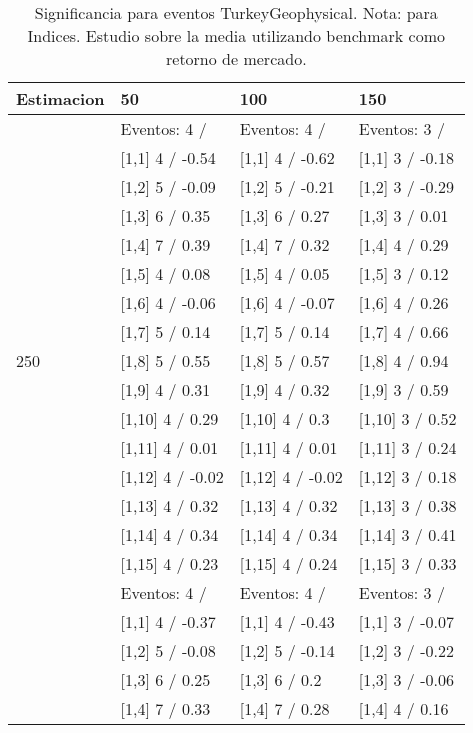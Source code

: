 \begin{table}

\caption{Significancia para eventos TurkeyGeophysical. Nota: para Indices. Estudio sobre la media utilizando benchmark como retorno de mercado.}
\centering
\begin{tabular}[t]{llll}
\toprule
Estimacion & 50 & 100 & 150\\
\midrule
 & Eventos:  4 / & Eventos:  4 / & Eventos:  3 /\\
 & {}[1,1] 4  / -0.54 & {}[1,1] 4  / -0.62 & {}[1,1] 3  / -0.18\\
 & {}[1,2] 5  / -0.09 & {}[1,2] 5  / -0.21 & {}[1,2] 3  / -0.29\\
 & {}[1,3] 6  / 0.35 & {}[1,3] 6  / 0.27 & {}[1,3] 3  / 0.01\\
 & {}[1,4] 7  / 0.39 & {}[1,4] 7  / 0.32 & {}[1,4] 4  / 0.29\\
\addlinespace
 & {}[1,5] 4  / 0.08 & {}[1,5] 4  / 0.05 & {}[1,5] 3  / 0.12\\
 & {}[1,6] 4  / -0.06 & {}[1,6] 4  / -0.07 & {}[1,6] 4  / 0.26\\
 & {}[1,7] 5  / 0.14 & {}[1,7] 5  / 0.14 & {}[1,7] 4  / 0.66\\
250 & {}[1,8] 5  / 0.55 & {}[1,8] 5  / 0.57 & {}[1,8] 4  / 0.94\\
 & {}[1,9] 4  / 0.31 & {}[1,9] 4  / 0.32 & {}[1,9] 3  / 0.59\\
\addlinespace
 & {}[1,10] 4  / 0.29 & {}[1,10] 4  / 0.3 & {}[1,10] 3  / 0.52\\
 & {}[1,11] 4  / 0.01 & {}[1,11] 4  / 0.01 & {}[1,11] 3  / 0.24\\
 & {}[1,12] 4  / -0.02 & {}[1,12] 4  / -0.02 & {}[1,12] 3  / 0.18\\
 & {}[1,13] 4  / 0.32 & {}[1,13] 4  / 0.32 & {}[1,13] 3  / 0.38\\
 & {}[1,14] 4  / 0.34 & {}[1,14] 4  / 0.34 & {}[1,14] 3  / 0.41\\
\addlinespace
 & {}[1,15] 4  / 0.23 & {}[1,15] 4  / 0.24 & {}[1,15] 3  / 0.33\\
 & Eventos:  4 / & Eventos:  4 / & Eventos:  3 /\\
 & {}[1,1] 4  / -0.37 & {}[1,1] 4  / -0.43 & {}[1,1] 3  / -0.07\\
 & {}[1,2] 5  / -0.08 & {}[1,2] 5  / -0.14 & {}[1,2] 3  / -0.22\\
 & {}[1,3] 6  / 0.25 & {}[1,3] 6  / 0.2 & {}[1,3] 3  / -0.06\\
\addlinespace
 & {}[1,4] 7  / 0.33 & {}[1,4] 7  / 0.28 & {}[1,4] 4  / 0.16\\

\end{tabular}
\end{table}
